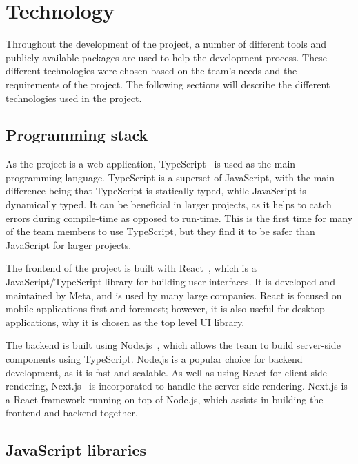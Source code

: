 \section{Technology}\label{sec:technology}

Throughout the development of the project, a number of different tools and publicly available packages are used to
help the development process.
These different technologies were chosen based on the team's needs and the requirements of the project.
The following sections will describe the different technologies used in the project.

\subsection{Programming stack}\label{subsec:programming}

As the project is a web application, TypeScript~\cite{typescript} is used as the main programming language.
TypeScript is a superset of JavaScript, with the main difference being that TypeScript is statically typed, while
JavaScript is dynamically typed.
It can be beneficial in larger projects, as it helps to catch errors during compile-time as opposed to run-time.
This is the first time for many of the team members to use TypeScript, but they find it to be safer than JavaScript
for larger projects.

The frontend of the project is built with React~\cite{react}, which is a JavaScript/TypeScript library for building
user interfaces.
It is developed and maintained by Meta, and is used by many large companies.
React is focused on mobile applications first and foremost; however, it is also useful for desktop applications, why it
is chosen as the top level UI library.

The backend is built using Node.js~\cite{node.js}, which allows the team to build server-side components using
TypeScript.
Node.js is a popular choice for backend development, as it is fast and scalable.
As well as using React for client-side rendering, Next.js~\cite{next.js} is incorporated to handle the server-side
rendering.
Next.js is a React framework running on top of Node.js, which assists in building the frontend and backend
together.

\subsection{JavaScript libraries}\label{subsec:libraries}

